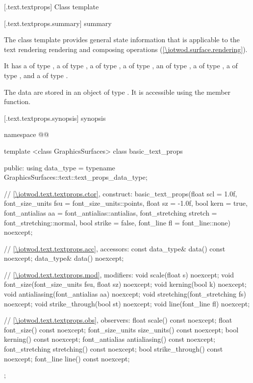 
 [\iotwod.text.textprops] {Class template }

 [\iotwod.text.textprops.summary] { summary}

\pnum
{}%
The  class template provides general state information that is applicable to the text rendering rendering and composing operations (\ref{\iotwod.surface.rendering}).

\pnum
It has a  of type , a  of type , a  of type , a  of type , an  of type , a  of type , a  of type , and a  of type .

\pnum
The data are stored in an object of type . It is accessible using the  member function.

 [\iotwod.text.textprops.synopsis] { synopsis}

\begin{codeblock}
namespace @\fullnamespace{}@ {
  template <class GraphicsSurfaces>
  class basic_text_props {
  public:
    using data_type = typename GraphicsSurfaces::text::text_props_data_type;

    // \ref{\iotwod.text.textprops.ctor}, construct:
    basic_text_props(float scl = 1.0f,
      font_size_units fsu = font_size_units::points,
      float sz = -1.0f,
      bool kern = true,
      font_antialias aa = font_antialias::antialias,
      font_stretching stretch = font_stretching::normal,
      bool strike = false,
      font_line fl = font_line::none) noexcept;

    // \ref{\iotwod.text.textprops.acc}, accessors:
    const data_type& data() const noexcept;
    data_type& data() noexcept;

    // \ref{\iotwod.text.textprops.mod}, modifiers:
    void scale(float s) noexcept;
    void font_size(font_size_units fsu, float sz) noexcept;
    void kerning(bool k) noexcept;
    void antialiasing(font_antialias aa) noexcept;
    void stretching(font_stretching fs) noexcept;
    void strike_through(bool st) noexcept;
    void line(font_line fl) noexcept;

    // \ref{\iotwod.text.textprops.obs}, observers:
    float scale() const noexcept;
    float font_size() const noexcept;
    font_size_units size_units() const noexcept;
    bool kerning() const noexcept;
    font_antialias antialiasing() const noexcept;
    font_stretching stretching() const noexcept;
    bool strike_through() const noexcept;
    font_line line() const noexcept;
  };
}
\end{codeblock}

